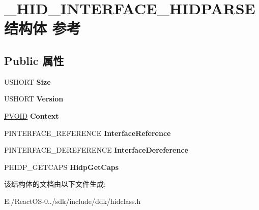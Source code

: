 \hypertarget{struct___h_i_d___i_n_t_e_r_f_a_c_e___h_i_d_p_a_r_s_e}{}\section{\+\_\+\+H\+I\+D\+\_\+\+I\+N\+T\+E\+R\+F\+A\+C\+E\+\_\+\+H\+I\+D\+P\+A\+R\+S\+E结构体 参考}
\label{struct___h_i_d___i_n_t_e_r_f_a_c_e___h_i_d_p_a_r_s_e}
\subsection*{Public 属性}
\begin{DoxyCompactItemize}
\item 
\mbox{\label{struct___h_i_d___i_n_t_e_r_f_a_c_e___h_i_d_p_a_r_s_e_ad0b68cae783fded1d8d27a5ddcb29bce}} 
U\+S\+H\+O\+RT {\bfseries Size}
\item 
\mbox{\label{struct___h_i_d___i_n_t_e_r_f_a_c_e___h_i_d_p_a_r_s_e_a9ba2030821af66a118e6549047502047}} 
U\+S\+H\+O\+RT {\bfseries Version}
\item 
\mbox{\label{struct___h_i_d___i_n_t_e_r_f_a_c_e___h_i_d_p_a_r_s_e_afc680ad42847cfabaca3bf4f4328bd2b}} 
\hyperlink{interfacevoid}{P\+V\+O\+ID} {\bfseries Context}
\item 
\mbox{\label{struct___h_i_d___i_n_t_e_r_f_a_c_e___h_i_d_p_a_r_s_e_abb1e8254087bdfa4fbcc6f683182746c}} 
P\+I\+N\+T\+E\+R\+F\+A\+C\+E\+\_\+\+R\+E\+F\+E\+R\+E\+N\+CE {\bfseries Interface\+Reference}
\item 
\mbox{\label{struct___h_i_d___i_n_t_e_r_f_a_c_e___h_i_d_p_a_r_s_e_a39f1097b3e361eb57b16f49bb6649956}} 
P\+I\+N\+T\+E\+R\+F\+A\+C\+E\+\_\+\+D\+E\+R\+E\+F\+E\+R\+E\+N\+CE {\bfseries Interface\+Dereference}
\item 
\mbox{\label{struct___h_i_d___i_n_t_e_r_f_a_c_e___h_i_d_p_a_r_s_e_a32cd58bafbd30c9a7503680c064b8d55}} 
P\+H\+I\+D\+P\+\_\+\+G\+E\+T\+C\+A\+PS {\bfseries Hidp\+Get\+Caps}
\end{DoxyCompactItemize}


该结构体的文档由以下文件生成\+:\begin{DoxyCompactItemize}
\item 
E\+:/\+React\+O\+S-\/0../sdk/include/ddk/hidclass.\+h\end{DoxyCompactItemize}
